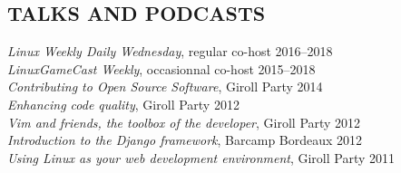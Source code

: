 \documentclass[line,resmargin]{res}
\begin{document}
\begin{resume}
\section{TALKS AND PODCASTS}
    {\sl Linux Weekly Daily Wednesday}, regular co-host \hfill 2016--2018 \\
    {\sl LinuxGameCast Weekly}, occasionnal co-host \hfill 2015--2018 \\
    {\sl Contributing to Open Source Software}, Giroll Party \hfill 2014 \\
    {\sl Enhancing code quality}, Giroll Party \hfill 2012 \\
    {\sl Vim and friends, the toolbox of the developer}, Giroll Party \hfill 2012 \\
    {\sl Introduction to the Django framework}, Barcamp Bordeaux \hfill 2012 \\
    {\sl Using Linux as your web development environment}, Giroll Party \hfill 2011

\end{resume}
\end{document}
